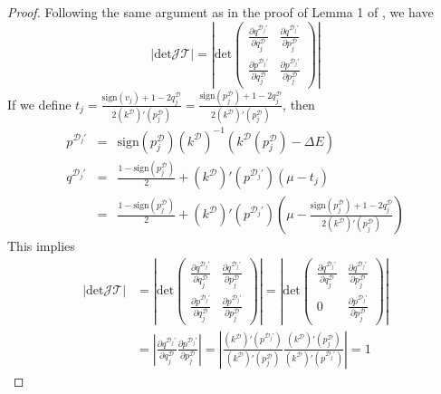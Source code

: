 \documentclass{article}
\newcommand{\cald}{\mathcal{D}}
\begin{document}
\begin{proof}
Following the same argument as in the proof of Lemma 1 of \cite{Mohasel_Afshar2015-uh}, we have
\[ 
	|\text{det}\mathcal{J} \mathcal{T}| = \left| \text{det}\left(\begin{array}{cc}
            \frac{\partial q^{\cald_j\prime}}{\partial q^\cald_j} & \frac{\partial q^{\cald_j\prime}}{\partial p^\cald_j}\\
            \frac{\partial p^{\cald_j\prime}}{\partial q^\cald_j} & \frac{\partial p^{\cald_j\prime}}{\partial p^\cald_j}
   \end{array}\right) \right|
\]
If we define $t_j = \frac{\text{sign} (v_j) + 1 - 2 q^\cald_j}{2 (k^\cald)' (p^\cald_j)} = \frac{\text{sign} (p^\cald_j) + 1 - 2 q^\cald_j}{2 (k^\cald)' (p^\cald_j)}$, then
\begin{eqnarray*}
    p^{\cald_j\prime} & = & \text{sign} (p^\cald_j) (k^\cald)^{- 1} (k^\cald (p^\cald_j) - \Delta E)\\
    q^{\cald_j\prime} & = & \frac{1 - \text{sign}(p^\cald_j)}{2} + (k^\cald)' (p^{\cald_j\prime}) (\mu - t_j)\\
                      & = & \frac{1 - \text{sign}(p^\cald_j)}{2} + (k^\cald)' (p^{\cald_j\prime}) \left( \mu - \frac{\text{sign} (p^\cald_j) + 1 - 2 q^\cald_j}{2 (k^\cald)' (p^\cald_j)} \right)
\end{eqnarray*}
This implies
\begin{align*}
	| \text{det}\mathcal{J} \mathcal{T} | &= \left| \text{det} \left(\begin{array}{cc}
            \frac{\partial q^{\cald_j\prime}}{\partial q^\cald_j} & \frac{\partial q^{\cald_j\prime}}{\partial p^\cald_j}\\
            \frac{\partial p^{\cald_j\prime}}{\partial q^\cald_j} & \frac{\partial p^{\cald_j\prime}}{\partial p^\cald_j}
			\end{array}\right) \right| = \left|\text{det} \left(\begin{array}{cc}
            \frac{\partial q^{\cald_j\prime}}{\partial q^\cald_j} & \frac{\partial q^{\cald_j\prime}}{\partial p^\cald_j}\\
            0 & \frac{\partial p^{\cald_j\prime}}{\partial p^\cald_j}
   \end{array}\right) \right| \\
                                          &= \left| \frac{\partial q^{\cald_j\prime}}{\partial q^\cald_j}
                                          \frac{\partial p^{\cald_j\prime}}{\partial p^\cald_j} \right| = \left| \frac{(k^\cald)'
                                          (p^{\cald_j\prime})}{(k^\cald)' (p^\cald_j)} \frac{(k^\cald)' (p^\cald_j)}{(k^\cald)' (p^{\cald_j\prime})}
			\right| = 1
\end{align*}
\end{proof}
\end{document}
